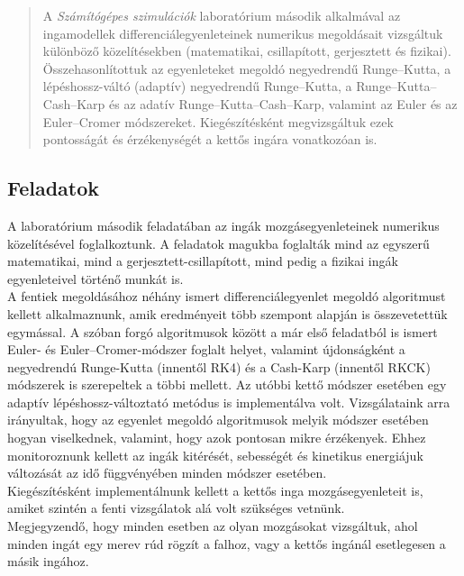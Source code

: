 \begin{abstract}
    \noindent A \emph{Számítógépes szimulációk} laboratórium második alkalmával az ingamodellek differenciálegyenleteinek numerikus megoldásait vizsgáltuk különböző közelítésekben (matematikai, csillapított, gerjesztett és fizikai). Összehasonlítottuk az egyenleteket megoldó negyedrendű Runge--Kutta, a lépéshossz-váltó (adaptív) negyedrendű Runge--Kutta, a Runge--Kutta--Cash--Karp és az adatív Runge--Kutta--Cash--Karp, valamint az Euler és az Euler--Cromer módszereket. Kiegészítésként megvizsgáltuk ezek pontosságát és érzékenységét a kettős ingára vonatkozóan is. \\
\end{abstract}

\begin{multicols}{2}

\section{Feladatok} \label{sec:1}
A laboratórium második feladatában az ingák mozgásegyenleteinek numerikus közelítésével foglalkoztunk. A feladatok magukba foglalták mind az egyszerű matematikai, mind a gerjesztett-csillapított, mind pedig a fizikai ingák egyenleteivel történő munkát is. \\
A fentiek megoldásához néhány ismert differenciálegyenlet megoldó algoritmust kellett alkalmaznunk, amik eredményeit több szempont alapján is összevetettük egymással. A szóban forgó algoritmusok között a már első feladatból is ismert Euler- és Euler--Cromer-módszer foglalt helyet, valamint újdonságként a negyedrendú Runge-Kutta (innentől RK4) és a Cash-Karp (innentől RKCK) módszerek is szerepeltek a többi mellett. Az utóbbi kettő módszer esetében egy adaptív lépéshossz-változtató metódus is implementálva volt. Vizsgálataink arra irányultak, hogy az egyenlet megoldó algoritmusok melyik módszer esetében hogyan viselkednek, valamint, hogy azok pontosan mikre érzékenyek. Ehhez monitoroznunk kellett az ingák kitérését, sebességét és kinetikus energiájuk változását az idő függvényében minden módszer esetében. \\
Kiegészítésként implementálnunk kellett a kettős inga mozgásegyenleteit is, amiket szintén a fenti vizsgálatok alá volt szükséges vetnünk. \\
Megjegyzendő, hogy minden esetben az olyan mozgásokat vizsgáltuk, ahol minden ingát egy merev rúd rögzít a falhoz, vagy a kettős ingánál esetlegesen a másik ingához.


\end{multicols}
